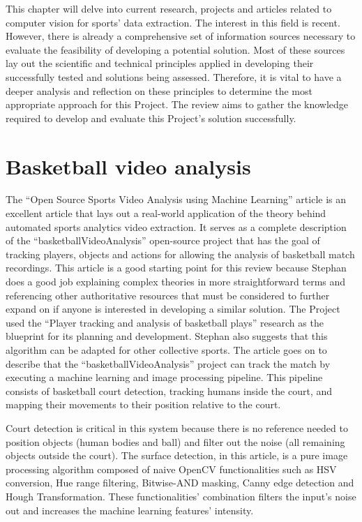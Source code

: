 \documentclass[
    11pt,
    twoside
]{report}
\begin{document}
This chapter will delve into current research, projects and articles related to computer vision for sports' data extraction. The interest in this field is recent. However, there is already a comprehensive set of information sources necessary to evaluate the feasibility of developing a potential solution. Most of these sources lay out the scientific and technical principles applied in developing their successfully tested and solutions being assessed. Therefore, it is vital to have a deeper analysis and reflection on these principles to determine the most appropriate approach for this Project. The review aims to gather the knowledge required to develop and evaluate this Project's solution successfully.


\section{Basketball video analysis}


The ``Open Source Sports Video Analysis using Machine Learning'' article \cite{stephan} is an excellent article that lays out a real-world application of the theory behind automated sports analytics video extraction. It serves as a complete description of the ``basketballVideoAnalysis'' open-source project \cite{stephan_code} that has the goal of tracking players, objects and actions for allowing the analysis of basketball match recordings. This article is a good starting point for this review because Stephan does a good job explaining complex theories in more straightforward terms and referencing other authoritative resources that must be considered to further expand on if anyone is interested in developing a similar solution. The Project used the ``Player tracking and analysis of basketball plays'' \cite{baskettrack} research as the blueprint for its planning and development. Stephan also suggests that this algorithm can be adapted for other collective sports. The article \cite{stephan} goes on to describe that the ``basketballVideoAnalysis'' project can track the match by executing a machine learning and image processing pipeline. This pipeline consists of basketball court detection, tracking humans inside the court, and mapping their movements to their position relative to the court.


Court detection is critical in this system because there is no reference needed to position objects (human bodies and ball) and filter out the noise (all remaining objects outside the court). The surface detection, in this article, is a pure image processing algorithm composed of naive OpenCV \cite{opencv} functionalities such as HSV conversion, Hue range filtering, Bitwise-AND masking, Canny edge detection and Hough Transformation. These functionalities' combination filters the input's noise out and increases the machine learning features' intensity.
\end{document}
